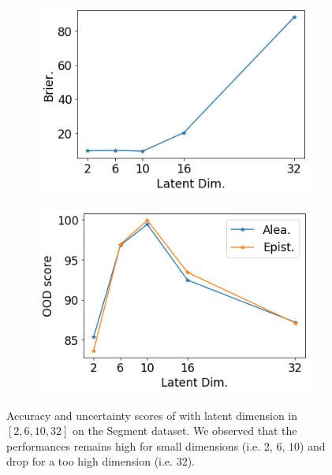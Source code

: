 \begin{figure}[ht]
    \begin{subfigure}[t]{0.33 \textwidth}
        \centering
        \includegraphics[width=1. \textwidth]{sections/006_neurips2020/figures/lat_dim_seg_brier.png}
    \end{subfigure}%
    \begin{subfigure}[t]{0.33 \textwidth}
        \centering
        \includegraphics[width=1. \textwidth]{sections/006_neurips2020/figures/lat_dim_seg_ood.png}
    \end{subfigure}%

    \caption{Accuracy and uncertainty scores of \oursacro with latent dimension in $[2, 6, 10, 32]$ on the Segment dataset. We observed that the performances remains high for small dimensions (i.e. $2$, $6$, $10$) and drop for a too high dimension (i.e. $32$).}
    \label{fig:latent_dim_segment}
\end{figure}

